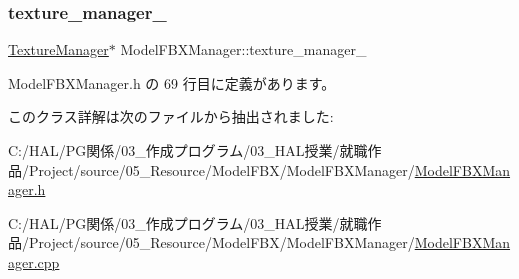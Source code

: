 \subsubsection{\texorpdfstring{texture\+\_\+manager\+\_\+}{texture\_manager\_}}
{\footnotesize\ttfamily \mbox{\hyperlink{class_texture_manager}{Texture\+Manager}}$\ast$ Model\+F\+B\+X\+Manager\+::texture\+\_\+manager\+\_\+\hspace{0.3cm}{\ttfamily [private]}}



 Model\+F\+B\+X\+Manager.\+h の 69 行目に定義があります。



このクラス詳解は次のファイルから抽出されました\+:\begin{DoxyCompactItemize}
\item 
C\+:/\+H\+A\+L/\+P\+G関係/03\+\_\+作成プログラム/03\+\_\+\+H\+A\+L授業/就職作品/\+Project/source/05\+\_\+\+Resource/\+Model\+F\+B\+X/\+Model\+F\+B\+X\+Manager/\mbox{\hyperlink{_model_f_b_x_manager_8h}{Model\+F\+B\+X\+Manager.\+h}}\item 
C\+:/\+H\+A\+L/\+P\+G関係/03\+\_\+作成プログラム/03\+\_\+\+H\+A\+L授業/就職作品/\+Project/source/05\+\_\+\+Resource/\+Model\+F\+B\+X/\+Model\+F\+B\+X\+Manager/\mbox{\hyperlink{_model_f_b_x_manager_8cpp}{Model\+F\+B\+X\+Manager.\+cpp}}\end{DoxyCompactItemize}
